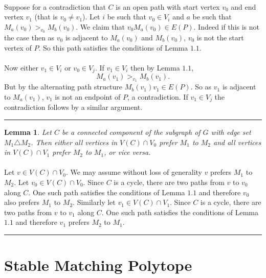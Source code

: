 \documentclass[letterpaper,12pt,oneside,onecolumn]{article}
\newtheorem{lemma}[fact]{Lemma}
\newenvironment{proof}{{\bf Proof:  }}{\hfill\rule{2mm}{2mm}}
\begin{document}
\begin{proof}
\paragraph{}
Suppose for a contradiction that $C$ is an open path with start vertex $v_0$ and end vertex $v_1$ (that is $v_0 \neq v_1$). Let $i$ be such that $v_0 \in V_i$ and $a$ be such that $M_a(v_0) >_{v_0} M_b(v_0)$. We claim that $v_0M_a(v_0) \in E(P)$. Indeed if this is not the case then as $v_0$ is adjacent to $M_a(v_0)$ and $M_b(v_0)$, $v_0$ is not the start vertex of $P$. So this path satisfies the conditions of Lemma $1.1$.
\paragraph{}
Now either $v_1 \in V_i$ or $v_0 \in V_j$. If $v_1 \in V_i$ then by Lemma $1.1$,
$$M_a(v_1) >_{v_1} M_b(v_1). $$
But by the alternating path structure $M_b(v_1)v_1 \in E(P)$. So as $v_1$ is adjacent to $M_a(v_1)$, $v_1$ is not an endpoint of $P$, a contradiction. If $v_1 \in V_j$ the contradiction follows by a similar argument.
\end{proof}
\begin{lemma}
Let $C$ be a connected component of the subgraph of $G$ with edge set $M_1 \triangle M_2$. Then either all vertices in $V(C) \cap V_0$ prefer $M_1$ to $M_2$ and all vertices in $V(C) \cap V_1$ prefer $M_2$ to $M_1$, or vice versa.
\end{lemma}
\begin{proof}
\paragraph{}
Let $v \in V(C) \cap V_0$. We may assume without loss of generality $v$ prefers $M_1$ to $M_2$. Let $v_0 \in V(C) \cap V_0$. Since $C$ is a cycle, there are two paths from $v$ to $v_0$ along $C$. One such path satisfies the conditions of Lemma $1.1$ and therefore $v_0$ also prefers $M_1$ to $M_2$. Similarly let $v_1 \in V(C) \cap V_1$. Since $C$ is a cycle, there are two paths from $v$ to $v_1$ along $C$. One such path satisfies the conditions of Lemma $1.1$ and therefore $v_1$ prefers $M_2$ to $M_1$.
\end{proof}

\section{Stable Matching Polytope}
\end{document}

